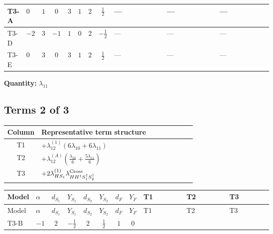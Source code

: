 \documentclass[8pt]{article}
\begin{document}
\begin{landscape}
\begin{longtable}{@{}llcccccc >{\raggedright\arraybackslash}p{0.21\linewidth} >{\raggedright\arraybackslash}p{0.21\linewidth} >{\raggedright\arraybackslash}p{0.21\linewidth}@{}}
\midrule
T3-A & $0$ & $1$ & $0$ & $3$ & $1$ & $2$ & $\frac{1}{2}$ & --- & --- & --- \\
\midrule
T3-D & $-2$ & $3$ & $-1$ & $1$ & $0$ & $2$ & $-\frac{1}{2}$ & --- & --- & --- \\
\midrule
T3-E & $0$ & $3$ & $0$ & $3$ & $1$ & $2$ & $\frac{1}{2}$ & --- & --- & --- \\
\midrule
\bottomrule
\end{longtable}
\clearpage
\noindent\textbf{Quantity: }$\lambda_{11}$\par\smallskip
\subsection*{Terms 2 of 3}
\begin{center}
\begin{tabular}{@{}c >{\raggedright\arraybackslash}p{0.82\linewidth}@{}}
\toprule
Column & Representative term structure \\
\midrule
T1 & \(\displaystyle +{\lambda_{12}^{(1)}} (6 {\lambda_{10}}+6 {\lambda_{11}})\) \\
\midrule
T2 & \(\displaystyle +{\lambda_{12}^{(A)}} \left(\frac{{\lambda_{10}}}{6}+\frac{5 {\lambda_{11}}}{6}\right)\) \\
\midrule
T3 & \(\displaystyle +2 {\lambda_{HS_1}^{(1)}} {\lambda_{H H^\dagger S_1^\dagger S_2^\dagger}^{\rm Cross}}\) \\
\midrule
\bottomrule
\end{tabular}
\end{center}
\smallskip
\tiny
\begin{longtable}{@{}llcccccc >{\raggedright\arraybackslash}p{0.21\linewidth} >{\raggedright\arraybackslash}p{0.21\linewidth} >{\raggedright\arraybackslash}p{0.21\linewidth}@{}}
\toprule
Model & $\alpha$ & $d_{S_1}$ & $Y_{S_1}$ & $d_{S_2}$ & $Y_{S_2}$ & $d_F$ & $Y_F$ & T1 & T2 & T3 \\
\midrule
\endfirsthead
\toprule
Model & $\alpha$ & $d_{S_1}$ & $Y_{S_1}$ & $d_{S_2}$ & $Y_{S_2}$ & $d_F$ & $Y_F$ & T1 & T2 & T3 \\
\midrule
\endhead
T3-B & $-1$ & $2$ & $-\frac{1}{2}$ & $2$ & $\frac{1}{2}$ & $1$ & $0$ & \scriptsize\adjustbox{max width=\linewidth}{$\begin{gathered} +{\lambda_{12}^{(1)}} (6 {\lambda_{10}}+6 {\lambda_{11}})\end{gathered}$} & \scriptsize\adjustbox{max width=\linewidth}{$\begin{gathered} +{\lambda_{12}^{(A)}} \left(\frac{{\lambda_{10}}}{6}+\frac{5 {\lambda_{11}}}{6}\right)\end{gathered}$} & \scriptsize\adjustbox{max width=\linewidth}{$\begin{gathered} +2 {\lambda_{HS_1}^{(1)}} {\lambda_{H H^\dagger S_1^\dagger S_2^\dagger}^{\rm Cross}}\end{gathered}$} \\

\end{longtable}
\end{landscape}
\end{document}
